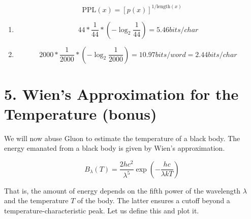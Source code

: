\documentclass[11pt]{article}
\providecommand{\tightlist}{%
      \setlength{\itemsep}{0pt}\setlength{\parskip}{0pt}}
\begin{document}
\[\mathrm{PPL}(x) = \left[p(x)\right]^{1/\mathrm{length}(x)}\]

    \begin{enumerate}
\def\labelenumi{\arabic{enumi}.}
\tightlist
\item
  \[44 * \frac{1}{44} * (-\log_2 \frac{1}{44}) = 5.46 bits / char\]
\item
  \[2000 * \frac{1}{2000} * (-\log_2 \frac{1}{2000}) = 10.97 bits / word = 2.44 bits / char\]
\end{enumerate}

    \hypertarget{wiens-approximation-for-the-temperature-bonus}{%
\section{5. Wien's Approximation for the Temperature
(bonus)}\label{wiens-approximation-for-the-temperature-bonus}}

We will now abuse Gluon to estimate the temperature of a black body. The
energy emanated from a black body is given by Wien's approximation.

\[B_\lambda(T) = \frac{2 h c^2}{\lambda^5} \exp\left(-\frac{h c}{\lambda k T}\right)\]

That is, the amount of energy depends on the fifth power of the
wavelength \(\lambda\) and the temperature \(T\) of the body. The latter
ensures a cutoff beyond a temperature-characteristic peak. Let us define
this and plot it.
\end{document}
